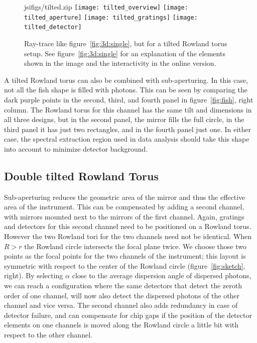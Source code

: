 \documentclass[twocolumn]{aastex631}
\begin{document}
\begin{figure}
    \begin{interactive}{js}{ifigs/tilted.zip}
    \texttt{[image: tilted\_overview]}
    \texttt{[image: tilted\_aperture]}
    \texttt{[image: tilted\_gratings]}
    \texttt{[image: tilted\_detector]}
    \end{interactive}
  \caption{Ray-trace like figure~\ref{fig:3d:single}, but for a tilted Rowland torus setup. See figure~\ref{fig:3d:single} for an explanation of the elements shown in the image and the interactivity in the online version.
  }
  \label{fig:3d:tilted}
  \end{figure}

A tilted Rowland torus can also be combined with sub-aperturing. %
In this case, not all the fish shape is filled with photons. This can be seen by comparing the dark purple points in the second, third, and fourth panel in figure~\ref{fig:fish}, right column. The Rowland torus for this channel has the same tilt and dimensions in all three designs, but in the second panel, the mirror fills the full circle, in the third panel it has just two rectangles, and in the fourth panel just one. In either case, the spectral extraction region used in data analysis should take this shape into account to minimize detector background.

\subsection{Double tilted Rowland Torus}

Sub-aperturing reduces the geometric area of the mirror and thus the effective area of the instrument. This can be compensated by adding a second channel, with mirrors mounted next to the mirrors of the first channel. Again, gratings and detectors for this second channel need to be positioned on a Rowland torus. However the two Rowland tori for the two channels need not be identical. When $R> r$ the Rowland circle intersects the focal plane twice. We choose those two points as the focal points for the two channels of the instrument; this layout is symmetric with respect to the center of the Rowland circle (figure~\ref{fig:sketch}, right). By selecting $\alpha$ close to the average dispersion angle of dispersed photons, we can reach a configuration where the same detectors that detect the zeroth order of one channel, will now also detect the dispersed photons of the other channel and vice versa. The second channel also adds redundancy in case of detector failure, and can compensate for chip gaps if the position of the detector elements on one channels is moved along the Rowland circle a little bit with respect to the other channel. %
\end{document}
